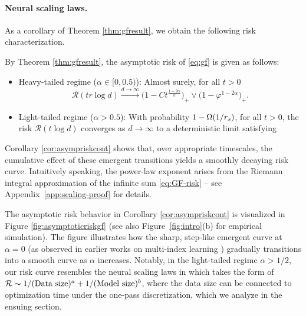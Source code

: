 \paragraph{Neural scaling laws.}
As a corollary of Theorem \ref{thm:gfresult}, we obtain the following risk characterization.
\begin{corollary}
\label{cor:asympriskcont}
By Theorem \ref{thm:gfresult}, the asymptotic risk of \eqref{eq:gf} is given as follows: 
\begin{itemize}[leftmargin = *, itemsep=0mm]
    \item   Heavy-tailed regime ($\alpha \in [0,0.5)$): Almost surely, for all $t > 0$
    $$\mathcal{R}(t r \log d)
    \xrightarrow
    {d \to \infty}
    \big(1 - C t^{\frac{1 - 2 \alpha}{\alpha}}  \big)_+  \vee \big(1 - \varphi^{1 - 2\alpha}\big)_+.$$ 
    \item Light-tailed regime ($\alpha > 0.5$):  With probability  $1 - \Omega(1/r_s)$, for all $t > 0$, the risk $\mathcal{R}(t \log d)$ converges as $d \to \infty$ to a deterministic limit satisfying
\end{itemize}
\end{corollary}
Corollary \ref{cor:asympriskcont} shows that, over appropriate timescales, the cumulative effect of these emergent transitions yields a smoothly decaying risk curve. Intuitively speaking, the power-law exponent arises from the Riemann integral approximation of the infinite sum \eqref{eq:GF-risk} -- see Appendix~\ref{app:scaling-proof} for details. 

The asymptotic risk behavior in Corollary \ref{cor:asympriskcont} is visualized in Figure \ref{fig:asymptoticriskgf}  (see also Figure~\ref{fig:intro}(b) for empirical simulation). The figure illustrates how the sharp, step-like emergent curve at $\alpha = 0$ (as observed in earlier works on multi-index learning \cite{benarous2021online,abbe2023sgd}) gradually transitions into a smooth curve as $\alpha$ increases. Notably, in the light-tailed regime $\alpha>1/2$, our risk curve resembles the neural scaling laws in \cite{kaplan2020scaling,hoffmann2022training} which takes the form of $\mathcal{R} \sim 1/(\text{Data size})^a + 1/(\text{Model size})^{b}$, where the data size can be connected to optimization time under the one-pass discretization, which we analyze in the ensuing section. 


